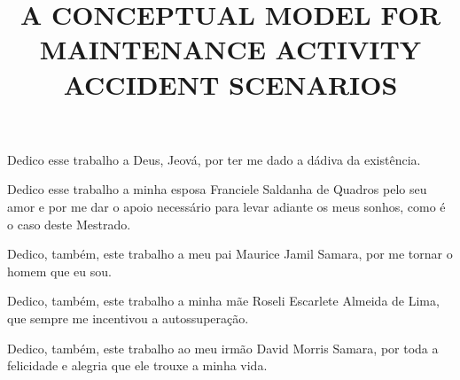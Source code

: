 \documentclass[openright]{normas-utf-tex} %
\title{\MakeUppercase{A Conceptual Model for Maintenance Activity Accident Scenarios}} %
\begin{document}
\capa %
\folhaderosto %





\begin{dedicatoria}
Dedico esse trabalho a Deus, Jeová, por ter me dado a dádiva da existência.

Dedico esse trabalho a minha esposa Franciele Saldanha de Quadros pelo seu amor e por me dar o apoio necessário para levar adiante os meus sonhos, como é o caso deste Mestrado. 

Dedico, também, este trabalho a meu pai Maurice Jamil Samara, por me tornar o homem que eu sou.

Dedico, também, este trabalho a minha mãe Roseli Escarlete Almeida de Lima, que sempre me incentivou a autossuperação.

Dedico, também, este trabalho ao meu irmão David Morris Samara, por toda a felicidade e alegria que ele trouxe a minha vida. 

\end{dedicatoria}
\end{document}
